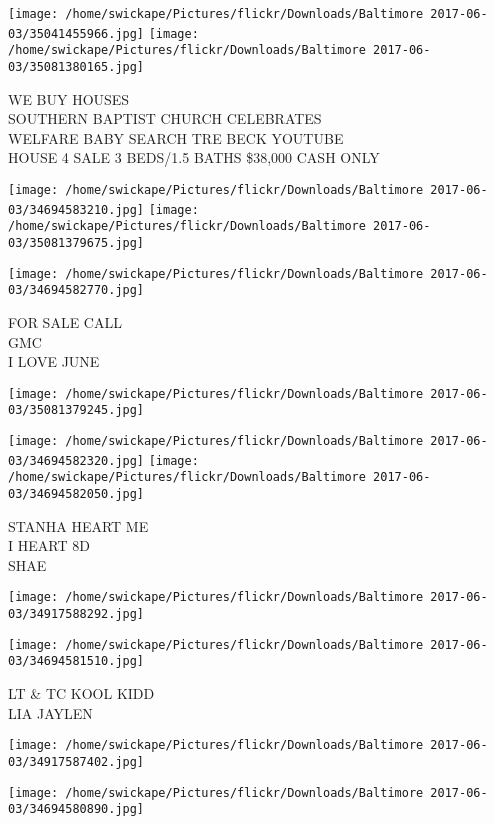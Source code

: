 \documentclass[10pt,letterpaper]{article}
\begin{document}
\texttt{[image: /home/swickape/Pictures/flickr/Downloads/Baltimore 2017-06-03/35041455966.jpg]}
\texttt{[image: /home/swickape/Pictures/flickr/Downloads/Baltimore 2017-06-03/35081380165.jpg]}

WE BUY HOUSES\\
SOUTHERN BAPTIST CHURCH CELEBRATES\\
WELFARE BABY SEARCH TRE BECK YOUTUBE\\
HOUSE 4 SALE 3 BEDS/1.5 BATHS \$38,000 CASH ONLY
\pagebreak

\texttt{[image: /home/swickape/Pictures/flickr/Downloads/Baltimore 2017-06-03/34694583210.jpg]}
\texttt{[image: /home/swickape/Pictures/flickr/Downloads/Baltimore 2017-06-03/35081379675.jpg]}

\vspace{0.25in}
\texttt{[image: /home/swickape/Pictures/flickr/Downloads/Baltimore 2017-06-03/34694582770.jpg]}

FOR SALE CALL\\
GMC\\
I LOVE JUNE
\pagebreak

\texttt{[image: /home/swickape/Pictures/flickr/Downloads/Baltimore 2017-06-03/35081379245.jpg]}

\vspace{0.25in}
\texttt{[image: /home/swickape/Pictures/flickr/Downloads/Baltimore 2017-06-03/34694582320.jpg]}
\texttt{[image: /home/swickape/Pictures/flickr/Downloads/Baltimore 2017-06-03/34694582050.jpg]}

STANHA HEART ME\\
I HEART 8D\\
SHAE
\pagebreak

\texttt{[image: /home/swickape/Pictures/flickr/Downloads/Baltimore 2017-06-03/34917588292.jpg]}

\vspace{0.25in}
\texttt{[image: /home/swickape/Pictures/flickr/Downloads/Baltimore 2017-06-03/34694581510.jpg]}

LT \& TC KOOL KIDD\\
LIA JAYLEN
\pagebreak

\texttt{[image: /home/swickape/Pictures/flickr/Downloads/Baltimore 2017-06-03/34917587402.jpg]}

\vspace{0.25in}
\texttt{[image: /home/swickape/Pictures/flickr/Downloads/Baltimore 2017-06-03/34694580890.jpg]}
\end{document}
